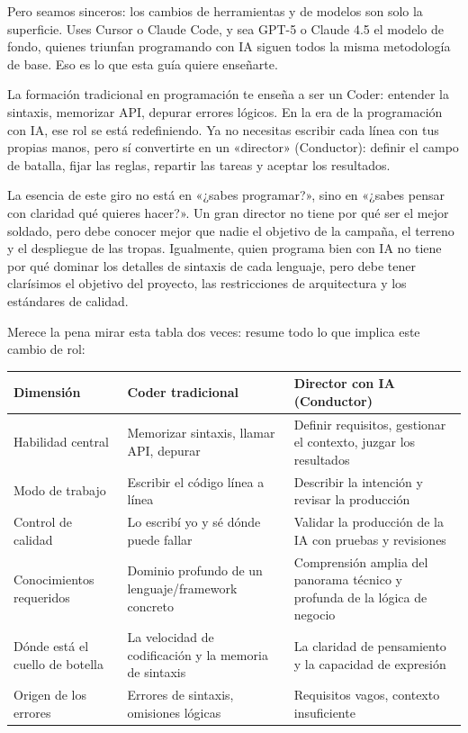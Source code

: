 Pero seamos sinceros: los cambios de herramientas y de modelos son solo la superficie. Uses Cursor o Claude Code, y sea GPT-5 o Claude 4.5 el modelo de fondo, quienes triunfan programando con IA siguen todos la misma metodología de base. Eso es lo que esta guía quiere enseñarte.


La formación tradicional en programación te enseña a ser un Coder: entender la sintaxis, memorizar API, depurar errores lógicos. En la era de la programación con IA, ese rol se está redefiniendo. Ya no necesitas escribir cada línea con tus propias manos, pero sí convertirte en un «director» (Conductor): definir el campo de batalla, fijar las reglas, repartir las tareas y aceptar los resultados.

La esencia de este giro no está en «¿sabes programar?», sino en «¿sabes pensar con claridad qué quieres hacer?». Un gran director no tiene por qué ser el mejor soldado, pero debe conocer mejor que nadie el objetivo de la campaña, el terreno y el despliegue de las tropas. Igualmente, quien programa bien con IA no tiene por qué dominar los detalles de sintaxis de cada lenguaje, pero debe tener clarísimos el objetivo del proyecto, las restricciones de arquitectura y los estándares de calidad.

Merece la pena mirar esta tabla dos veces: resume todo lo que implica este cambio de rol:

\begin{center}
\begin{tabularx}{\linewidth}{|X|X|X|}
\hline
\textbf{Dimensión} & \textbf{Coder tradicional} & \textbf{Director con IA (Conductor)} \tabularnewline
\hline
Habilidad central & Memorizar sintaxis, llamar API, depurar & Definir requisitos, gestionar el contexto, juzgar los resultados \tabularnewline
Modo de trabajo & Escribir el código línea a línea & Describir la intención y revisar la producción \tabularnewline
Control de calidad & Lo escribí yo y sé dónde puede fallar & Validar la producción de la IA con pruebas y revisiones \tabularnewline
Conocimientos requeridos & Dominio profundo de un lenguaje/framework concreto & Comprensión amplia del panorama técnico y profunda de la lógica de negocio \tabularnewline
Dónde está el cuello de botella & La velocidad de codificación y la memoria de sintaxis & La claridad de pensamiento y la capacidad de expresión \tabularnewline
Origen de los errores & Errores de sintaxis, omisiones lógicas & Requisitos vagos, contexto insuficiente \tabularnewline
\hline
\end{tabularx}
\end{center}

